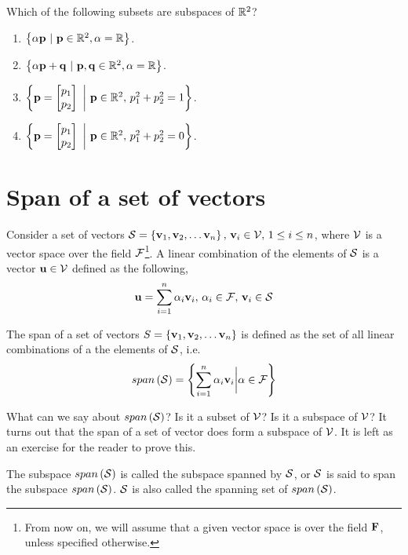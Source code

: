 \begin{problem*}[frametitle=Subspaces]
Which of the following subsets are subspaces of $\mathbb{R}^2$?
\begin{enumerate}
    \item $\left\{ \alpha \mathbf{p} \,\, \vert \,\, \mathbf{p} \in \mathbb{R}^2, \alpha = \mathbb{R} \right\}$.
    \item $\left\{ \alpha \mathbf{p} + \mathbf{q} \,\, \vert \,\, \mathbf{p}, \mathbf{q} \in \mathbb{R}^2, \alpha = \mathbb{R} \right\}$.
    \item $\lc \mf{p} = \bmxc p_1 \\ p_2\emx \,\, \bigg\vert \,\, \mf{p} \in \mb{R}^2, \, p_1^2 + p_2^2 = 1 \rc$.
    \item $\lc \mf{p} = \bmxc p_1 \\ p_2\emx \,\, \bigg\vert \,\, \mf{p} \in \mb{R}^2, \, p_1^2 + p_2^2 = 0 \rc$.
\end{enumerate}
\end{problem*}

\section{Span of a set of vectors}
Consider a set of vectors $\mathcal{S} = \left\{ \mathbf{v}_1, \mathbf{v}_2, \ldots \mathbf{v}_n\right\}, \, \mathbf{v}_i \in \mathcal{V}, \, 1 \leq i \leq n$, where $\mathcal{V}$ is a vector space over the field $\mathcal{F}$\footnote{From now on, we will assume that a given vector space is over the field $\mathbf{F}$, unless specified otherwise.}. A linear combination of the elements of $\mathcal{S}$ is a vector $\mathbf{u} \in \mathcal{V}$ defined as the following,
\[ \mathbf{u} = \sum_{i=1}^{n}\alpha_i\mathbf{v}_i, \, \alpha_i \in \mathcal{F}, \, \mathbf{v}_i \in \mathcal{S} \]

\begin{definition}[frametitle=Span of set of vectors]
The span of a set of vectors $S = \left\{ \mathbf{v}_1, \mathbf{v}_2, \ldots \mathbf{v}_n\right\}$ is defined as the set of all linear combinations of a the elements of $\mathcal{S}$, i.e.
\[ span\left( \mathcal{S} \right) = \left\{ \sum_{i=1}^n\alpha_i\mathbf{v}_i \bigg\vert \alpha \in \mathcal{F} \right\} \]
\end{definition}

What can we say about $span\left( \mathcal{S}\right)$? Is it a subset of $\mathcal{V}$? Is it a subspace of $\mathcal{V}$? It turns out that the span of a set of vector does form a subspace of $\mathcal{V}$. It is left as an exercise for the reader to prove this.

The subspace $span\left(\mathcal{S}\right)$ is called the subspace spanned by $\mathcal{S}$, or $\mathcal{S}$ is said to span the subspace $span\left( \mathcal{S}\right)$. $\mathcal{S}$ is also called the spanning set of $span\left( \mathcal{S}\right)$.

